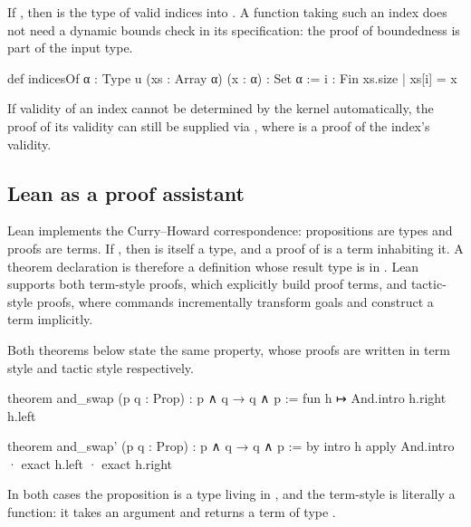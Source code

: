 \begin{example}
\label{ex:array-bounds}
If ,
then  is the type of valid indices into .  A
function taking such an index does not need a dynamic bounds check in its
specification: the proof of boundedness is part of the input type.

\begin{leanlisting}
def indicesOf {α : Type u} (xs : Array α) (x : α) : Set α :=
  { i : Fin xs.size | xs[i] = x }
\end{leanlisting}

If validity of an index cannot be determined by the kernel automatically, the proof of its validity can still be supplied via , where  is a proof of the index's validity.

\end{example}

\subsection{Lean as a proof assistant}
\label{subsec:lean-proof-assistant}

Lean implements the Curry--Howard correspondence: propositions are types and
proofs are terms.  If , then  is itself a type, and a proof
of  is a term  inhabiting it.  A theorem declaration is therefore
a definition whose result type is
in .  Lean supports both term-style proofs, which explicitly build proof
terms, and tactic-style proofs, where commands incrementally transform goals and
construct a term implicitly.

\begin{example}
Both theorems below state the same property, whose proofs are written in term style and tactic style respectively.

\begin{leanlisting}
theorem and_swap (p q : Prop) : p ∧ q → q ∧ p :=
  fun h ↦ And.intro h.right h.left

theorem and_swap' (p q : Prop) : p ∧ q → q ∧ p := by
  intro h
  apply And.intro
  · exact h.left
  · exact h.right
\end{leanlisting}
In both cases the proposition  is a type living in , and the term-style  is literally a function: it takes an argument  and returns a term of type .
\end{example}
